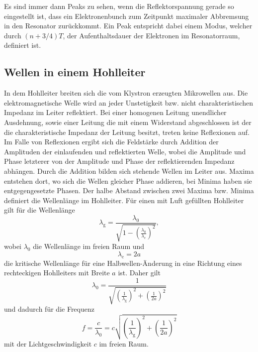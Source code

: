 Es sind immer dann Peaks zu sehen, wenn die Reflektorspannung gerade so eingestellt ist, dass ein Elektronenbunch zum Zeitpunkt maximaler Abbremsung in den Resonator zurückkommt.
Ein Peak entspricht dabei einem Modus, welcher durch $(n+3/4)T$, der Aufenthaltsdauer der Elektronen im Resonatorraum, definiert ist.

\subsection{Wellen in einem Hohlleiter}

In dem Hohlleiter breiten sich die vom Klystron erzeugten Mikrowellen aus.
Die elektromagnetische Welle wird an jeder Unstetigkeit bzw. nicht charakteristischen Impedanz im Leiter reflektiert.
Bei einer homogenen Leitung unendlicher Ausdehnung, sowie einer Leitung die mit einem Widerstand abgeschlossen ist der die charakteristische Impedanz der Leitung besitzt, treten keine Reflexionen auf.
Im Falle von Reflexionen ergibt sich die Feldstärke durch Addition der Amplituden der einlaufenden und reflektierten Welle, wobei die Amplitude und Phase letzterer von der Amplitude und Phase der reflektierenden Impedanz abhängen.
Durch die Addition bilden sich stehende Wellen im Leiter aus.
Maxima entstehen dort, wo sich die Wellen gleicher Phase addieren, bei Minima haben sie entgegengesetzte Phasen.
Der halbe Abstand zwischen zwei Maxima bzw. Minima definiert die Wellenlänge im Hohlleiter.
Für einen mit Luft gefüllten Hohlleiter gilt für die Wellenlänge
\begin{equation}
  \lambda_\text{g} = \frac{\lambda_0}{\sqrt{1-\left(\frac{\lambda_0}{\lambda_\text{c}}\right)^2}},
\end{equation}
wobei $\lambda_0$ die Wellenlänge im freien Raum und
\begin{equation}
  \lambda_\text{c} = 2a%
\end{equation}
die kritische Wellenlänge für eine Halbwellen-Änderung in eine Richtung eines rechteckigen Hohlleiters mit Breite $a$ ist.
Daher gilt
\begin{equation}
  \lambda_0 = \frac{1}{\sqrt{\left(\frac{1}{\lambda_\text{g}}\right)^2+\left(\frac{1}{2a}\right)^2}} \label{eqn:1}
\end{equation}
und dadurch für die Frequenz
\begin{equation}
  f = \frac{c}{\lambda_0} = c \sqrt{\left(\frac{1}{\lambda_\text{g}}\right)^2+\left(\frac{1}{2a}\right)^2} \label{eqn:2}
\end{equation}
mit der Lichtgeschwindigkeit $c$ im freien Raum.

